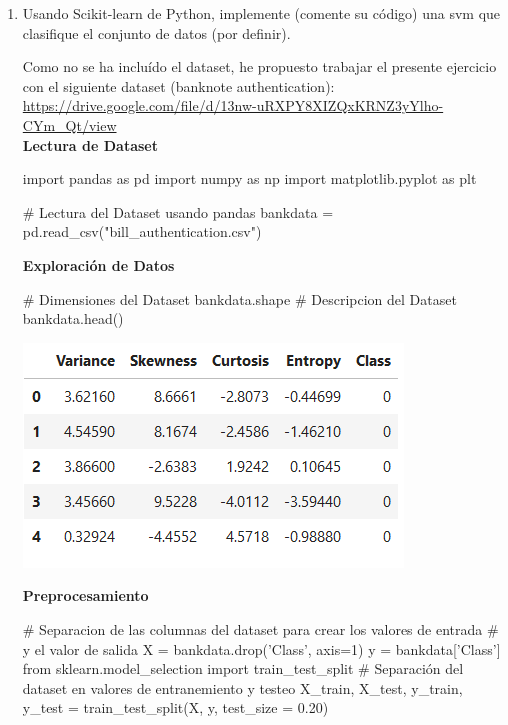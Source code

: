 \documentclass[paper=a4, fontsize=11pt]{scrartcl}
\numberwithin{equation}{section}		%
\numberwithin{figure}{section}			%
\numberwithin{table}{section}				%
\begin{document}
\begin{enumerate}
    \item Usando Scikit-learn de Python, implemente (comente su código) una svm que clasifique el conjunto de datos (por definir).
    
    Como no se ha incluído el dataset, he propuesto trabajar el presente ejercicio con el siguiente dataset (banknote authentication):\\
    \url{https://drive.google.com/file/d/13nw-uRXPY8XIZQxKRNZ3yYlho-CYm_Qt/view}\\
    
    \textbf{Lectura de Dataset}
    
    \begin{python}
    import pandas as pd  
    import numpy as np  
    import matplotlib.pyplot as plt  
    
    # Lectura del Dataset usando pandas
    bankdata = pd.read_csv("bill_authentication.csv")
    \end{python}
    
    \textbf{Exploración de Datos}
    
    \begin{python}
    # Dimensiones del Dataset
    bankdata.shape
    # Descripcion del Dataset
    bankdata.head()
    \end{python}
    
    \includegraphics[scale=0.8]{df1_head}
    
    \textbf{Preprocesamiento}
    
    \begin{python}
    # Separacion de las columnas del dataset para crear los valores de entrada 
    # y el valor de salida
    X = bankdata.drop('Class', axis=1)
    y = bankdata['Class']
    from sklearn.model_selection import train_test_split
    # Separación del dataset en valores de entranemiento y testeo
    X_train, X_test, y_train, y_test = train_test_split(X, y, test_size = 0.20)
    \end{python}
    

\end{enumerate}
\end{document}
